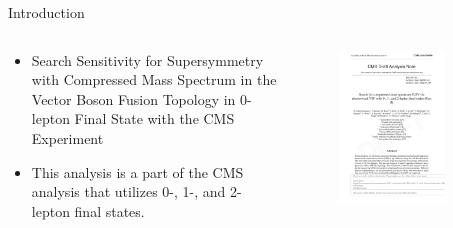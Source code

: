 \makeatletter \graphicspath{ {@path} }
\makeatother

\begin{frame}[fragile]{Introduction}
  \begin{columns}
    \begin{column}{0.6\textwidth}
       \begin{itemize}
        \item Search Sensitivity for Supersymmetry with Compressed Mass Spectrum in the Vector Boson Fusion Topology in 0-lepton Final State with the CMS Experiment
        \item This analysis is a part of the CMS analysis that utilizes 0-, 1-, and 2-lepton final states.
      \end{itemize}	
         
    \end{column}
    \begin{column}{0.4\textwidth}
      \begin{figure}[htpb]
        \centering
        \includegraphics[width=0.8\textwidth]{fig/misc/AN-20-096-cover.pdf}
      \end{figure}
      
    \end{column}
  \end{columns}
\end{frame}

